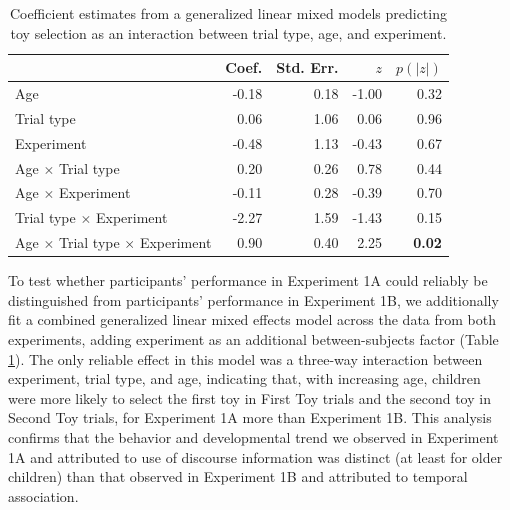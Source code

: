\documentclass[man]{apa2}
\begin{document}
  \begin{table} [t]
   \caption{Coefficient estimates from a generalized linear mixed models predicting toy selection as an interaction between trial type, age, and experiment.
   \label{tab:coefficient_estimates_full} } 
   \begin{center} 
     \begin{tabular}{lrrrr} 
       \hline 
       \null  & Coef. & Std. Err. & $z$  &  $p(|z|)$ \\
       \hline  
        Age                                                                     & -0.18 &  0.18 & -1.00 & 0.32 \\
        Trial type                                                            & 0.06 &1.06 &  0.06 & 0.96 \\
        Experiment                                                         & -0.48 & 1.13 &  -0.43 & 0.67 \\
        Age $\times$ Trial type                                      & 0.20 & 0.26 & 0.78 & 0.44\\ 
        Age $\times$ Experiment                                   & -0.11 & 0.28 & -0.39 & 0.70\\ 
        Trial type $\times$ Experiment                          & -2.27 & 1.59 & -1.43 & 0.15 \\ 
        Age $\times$ Trial type $\times$ Experiment    & 0.90 & 0.40 & 2.25 & {\bf 0.02} \\ 
       \hline 
     \end{tabular} 
  \end{center}
 \end{table}
 
To test whether participants' performance in Experiment 1A could reliably be distinguished from participants' performance in Experiment 1B, we additionally fit a combined generalized linear mixed effects model across the data from both experiments, adding experiment as an additional between-subjects factor (Table \ref{tab:coefficient_estimates_full}).  The only reliable effect in this model was a three-way interaction between experiment, trial type, and age, indicating that, with increasing age, children were more likely to select the first toy in First Toy trials and the second toy in Second Toy trials, for Experiment 1A more than Experiment 1B. This analysis confirms that the behavior and developmental trend we observed in Experiment 1A and attributed to use of discourse information was distinct (at least for older children) than that observed in Experiment 1B and attributed to temporal association.
\end{document}

